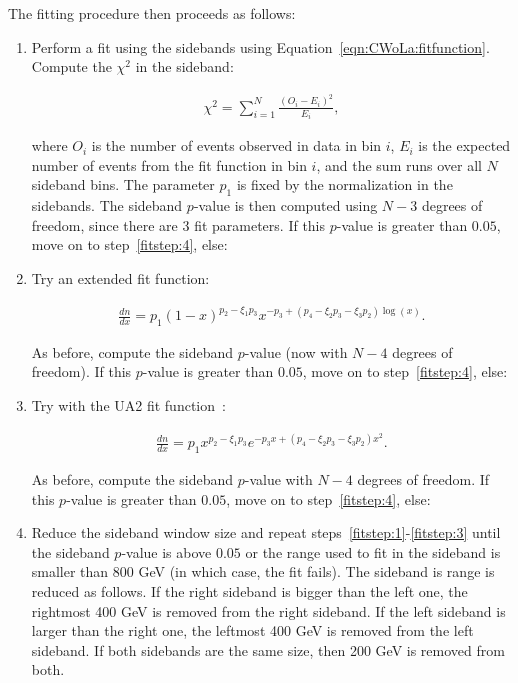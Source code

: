The fitting procedure then proceeds as follows:

\begin{enumerate}
  \item \label{fitstep:1} Perform a fit using the sidebands using Equation~\ref{eqn:CWoLa:fitfunction}.  Compute the $\chi^2$ in the sideband:

\begin{align}
\chi^2=\sum_{i=1}^N \frac{(O_i-E_i)^2}{E_i},
\end{align}

\noindent where $O_i$ is the number of events observed in data in bin $i$, $E_i$ is the expected number of events from the fit function in bin $i$, and the sum runs over all $N$ sideband bins.
The parameter $p_1$ is fixed by the normalization in the sidebands.
The sideband $p$-value is then computed using $N-3$ degrees of freedom, since there are 3 fit parameters.
If this $p$-value is greater than $0.05$, move on to step~\ref{fitstep:4}, else:
\item \label{fitstep:2} Try an extended fit function:

\begin{align}
\frac{dn}{dx}=p_1(1-x)^{p_2-\xi_1 p_3}x^{-p_3+(p_4-\xi_2p_3-\xi_3p_2)\log(x)}.
\end{align}

\noindent As before, compute the sideband $p$-value (now with $N-4$ degrees of freedom).
If this $p$-value is greater than $0.05$, move on to step~\ref{fitstep:4}, else:

\item \label{fitstep:3} Try with the UA2 fit function~\cite{Alitti:1990kw}:

\begin{align}
\frac{dn}{dx}=p_1x^{p_2-\xi_1 p_3}e^{-p_3x+(p_4-\xi_2p_3-\xi_3p_2)x^2}.
\end{align}

\noindent As before, compute the sideband $p$-value with $N-4$ degrees of freedom.
If this $p$-value is greater than $0.05$, move on to step~\ref{fitstep:4}, else:

\item Reduce the sideband window size and repeat steps~\ref{fitstep:1}-\ref{fitstep:3} until the sideband $p$-value is above $0.05$ or the range used to fit in the sideband is smaller than 800 GeV (in which case, the fit fails).
The sideband is range is reduced as follows.
If the right sideband is bigger than the left one, the rightmost 400 GeV is removed from the right sideband.
If the left sideband is larger than the right one, the leftmost 400 GeV is removed from the left sideband.
If both sidebands are the same size, then 200 GeV is removed from both.


\end{enumerate}
